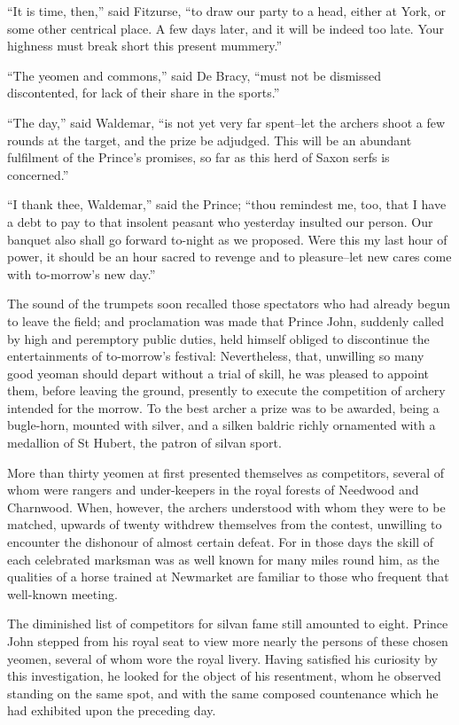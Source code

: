 ``It is time, then,'' said Fitzurse, ``to draw our party to a head,
either at York, or some other centrical place. A few days later, and it
will be indeed too late. Your highness must break short this present
mummery.''

``The yeomen and commons,'' said De Bracy, ``must not be dismissed
discontented, for lack of their share in the sports.''

``The day,'' said Waldemar, ``is not yet very far spent--let the archers
shoot a few rounds at the target, and the prize be adjudged. This will
be an abundant fulfilment of the Prince's promises, so far as this herd
of Saxon serfs is concerned.''

``I thank thee, Waldemar,'' said the Prince; ``thou remindest me, too,
that I have a debt to pay to that insolent peasant who yesterday
insulted our person. Our banquet also shall go forward to-night as we
proposed. Were this my last hour of power, it should be an hour sacred
to revenge and to pleasure--let new cares come with to-morrow's new
day.''

The sound of the trumpets soon recalled those spectators who had already
begun to leave the field; and proclamation was made that Prince John,
suddenly called by high and peremptory public duties, held himself
obliged to discontinue the entertainments of to-morrow's festival:
Nevertheless, that, unwilling so many good yeoman should depart without
a trial of skill, he was pleased to appoint them, before leaving the
ground, presently to execute the competition of archery intended for the
morrow. To the best archer a prize was to be awarded, being a
bugle-horn, mounted with silver, and a silken baldric richly ornamented
with a medallion of St Hubert, the patron of silvan sport.

More than thirty yeomen at first presented themselves as competitors,
several of whom were rangers and under-keepers in the royal forests of
Needwood and Charnwood. When, however, the archers understood with whom
they were to be matched, upwards of twenty withdrew themselves from the
contest, unwilling to encounter the dishonour of almost certain defeat.
For in those days the skill of each celebrated marksman was as well
known for many miles round him, as the qualities of a horse trained at
Newmarket are familiar to those who frequent that well-known meeting.

The diminished list of competitors for silvan fame still amounted to
eight. Prince John stepped from his royal seat to view more nearly the
persons of these chosen yeomen, several of whom wore the royal livery.
Having satisfied his curiosity by this investigation, he looked for the
object of his resentment, whom he observed standing on the same spot,
and with the same composed countenance which he had exhibited upon the
preceding day.

